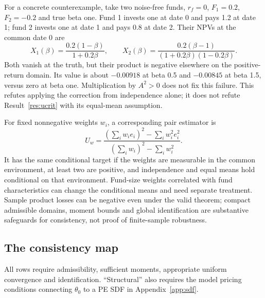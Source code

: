 \documentclass[11pt]{article}
\theoremstyle{plain}
\theoremstyle{definition}
\begin{document}
For a concrete counterexample, take two noise-free funds, $r_f=0$, $F_1=0.2$, $F_2=-0.2$ and true beta one. Fund 1 invests one at date 0 and pays 1.2 at date 1; fund 2 invests one at date 1 and pays 0.8 at date 2. Their NPVs at the common date 0 are
\[
X_1(\beta)=\frac{0.2(1-\beta)}{1+0.2\beta},\qquad
X_2(\beta)=\frac{0.2(\beta-1)}{(1+0.2\beta)(1-0.2\beta)}.
\]
Both vanish at the truth, but their product is negative elsewhere on the positive-return domain. Its value is about $-0.00918$ at beta 0.5 and $-0.00845$ at beta 1.5, versus zero at beta one. Multiplication by $A^2>0$ does not fix this failure. This refutes applying the correction from independence alone; it does not refute Result~\ref{res:ucrit} with its equal-mean assumption.

For fixed nonnegative weights $w_i$, a corresponding pair estimator is
\[
U_w=\frac{(\sum_iw_ie_i)^2-\sum_iw_i^2e_i^2}
{(\sum_iw_i)^2-\sum_iw_i^2}.
\]
It has the same conditional target if the weights are measurable in the common environment, at least two are positive, and independence and equal means hold conditional on that environment. Fund-size weights correlated with fund characteristics can change the conditional means and need separate treatment. Sample product losses can be negative even under the valid theorem; compact admissible domains, moment bounds and global identification are substantive safeguards for consistency, not proof of finite-sample robustness.

\subsection{The consistency map}

All rows require admissibility, sufficient moments, appropriate uniform convergence and identification. ``Structural'' also requires the model pricing conditions connecting $\theta_0$ to a PE SDF in Appendix~\ref{app:sdf}.
\end{document}
